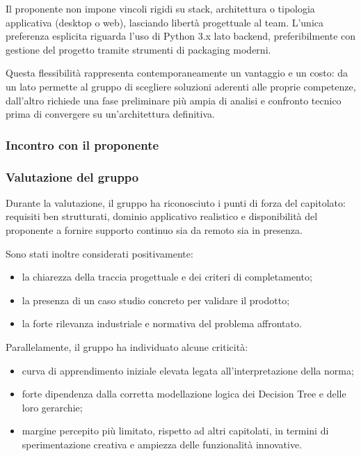 \documentclass[a4paper,12pt]{article}
\begin{document}
Il proponente non impone vincoli rigidi su stack, architettura o tipologia applicativa (desktop o web), lasciando libertà progettuale al team. L'unica preferenza esplicita riguarda l'uso di Python 3.x lato backend, preferibilmente con gestione del progetto tramite strumenti di packaging moderni.

Questa flessibilità rappresenta contemporaneamente un vantaggio e un costo: da un lato permette al gruppo di scegliere soluzioni aderenti alle proprie competenze, dall'altro richiede una fase preliminare più ampia di analisi e confronto tecnico prima di convergere su un'architettura definitiva.

\subsubsection{Incontro con il proponente}

\subsubsection{Valutazione del gruppo}

Durante la valutazione, il gruppo ha riconosciuto i punti di forza del capitolato: requisiti ben strutturati, dominio applicativo realistico e disponibilità del proponente a fornire supporto continuo sia da remoto sia in presenza.

Sono stati inoltre considerati positivamente:

\begin{itemize}
    \item la chiarezza della traccia progettuale e dei criteri di completamento;
    \item la presenza di un caso studio concreto per validare il prodotto;
    \item la forte rilevanza industriale e normativa del problema affrontato.
\end{itemize}

Parallelamente, il gruppo ha individuato alcune criticità:

\begin{itemize}
    \item curva di apprendimento iniziale elevata legata all'interpretazione della norma;
    \item forte dipendenza dalla corretta modellazione logica dei Decision Tree e delle loro gerarchie;
    \item margine percepito più limitato, rispetto ad altri capitolati, in termini di sperimentazione creativa e ampiezza delle funzionalità innovative.
\end{itemize}
\end{document}
